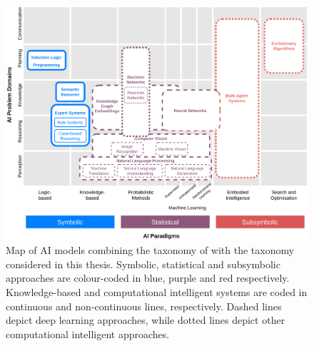 \begin{figure}
    \centering
    \includegraphics[width=\linewidth]{2_stateoftheart/figures/AI_Map.eps}
    \caption{Map of AI models combining the taxonomy of \cite{corea_ai_2019} with the taxonomy considered in this thesis. Symbolic, statistical and subsymbolic approaches are colour-coded in blue, purple and red respectively. Knowledge-based and computational intelligent systems are coded in continuous and non-continuous lines, respectively. Dashed lines depict deep learning approaches, while dotted lines depict other computational intelligent approaches.}
    \label{fig:ai_map}
\end{figure}


